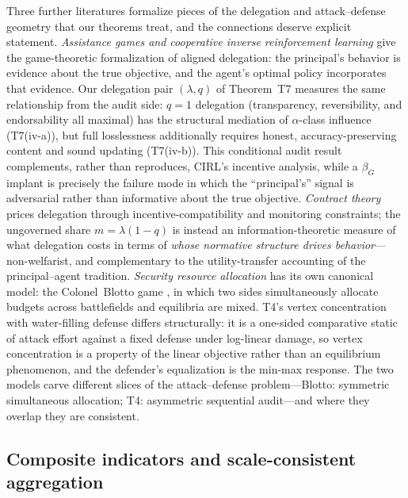 Three further literatures formalize pieces of the delegation and
attack--defense geometry that our theorems treat, and the connections deserve
explicit statement. \emph{Assistance games and cooperative inverse
reinforcement learning} \citep{hadfieldmenell2016} give the game-theoretic
formalization of aligned delegation: the principal's behavior is evidence
about the true objective, and the agent's optimal policy incorporates that
evidence. Our delegation pair $(\lambda,q)$ of Theorem~T7 measures the same
relationship from the audit side: $q=1$ delegation (transparency,
reversibility, and endorsability all maximal) has the structural mediation
of $\alpha$-class influence (T7(iv-a)), but full losslessness additionally
requires honest, accuracy-preserving content and sound updating (T7(iv-b)).
This conditional audit result complements, rather than reproduces, CIRL's
incentive analysis, while a $\beta_G$ implant is precisely the failure mode in
which the ``principal's'' signal is adversarial rather than informative about
the true objective. \emph{Contract theory} \citep{laffont_martimort2002}
prices delegation through incentive-compatibility and monitoring constraints;
the ungoverned share $m=\lambda(1-q)$ is instead an information-theoretic
measure of what delegation costs in terms of \emph{whose normative structure
drives behavior}---non-welfarist, and complementary to the utility-transfer
accounting of the principal--agent tradition. \emph{Security resource
allocation} has its own canonical model: the Colonel~Blotto game
\citep{roberson2006}, in which two sides simultaneously allocate budgets
across battlefields and equilibria are mixed. T4's vertex concentration with
water-filling defense differs structurally: it is a one-sided comparative
static of attack effort against a fixed defense under log-linear damage, so
vertex concentration is a property of the linear objective rather than an
equilibrium phenomenon, and the defender's equalization is the min-max
response. The two models carve different slices of the attack--defense
problem---Blotto: symmetric simultaneous allocation; T4: asymmetric
sequential audit---and where they overlap they are consistent.

\subsection{Composite indicators and scale-consistent aggregation}\label{rw:composite}

